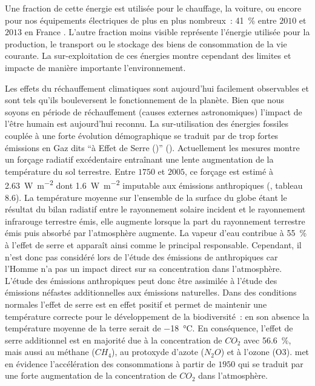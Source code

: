 Une fraction de cette énergie est utilisée pour le chauffage, la voiture, ou encore pour
nos équipements électriques de plus en plus nombreux~: \SI{+41}{\percent} entre $2010$ et
$2013$ en France \textcite{ADEME2015}. L’autre fraction moins visible représente
l’énergie utilisée pour la production, le transport ou le stockage des
biens de consommation de la vie courante. La sur-exploitation de ces énergies montre
cependant des limites et impacte de manière importante l’environnement.

Les effets du réchauffement climatiques sont aujourd’hui facilement observables et sont
tels qu’ils bouleversent le fonctionnement de la planète. Bien que nous soyons en période
de réchauffement (causes externes astronomiques) l’impact de l’être humain est aujourd’hui
reconnu. La sur-utilisation des énergies fossiles couplée à une forte évolution
démographique se traduit par de trop fortes émissions en Gaz dits \enquote{à Effet de
Serre ()} (). Actuellement les mesures montre un forçage
radiatif excédentaire entraînant une lente augmentation de la température du sol
terrestre. Entre $1750$ et $2005$, ce forçage est estimé à
\SI{2.63}{\watt\per\metre\squared} dont \SI{1.6}{\watt\per\metre\squared} imputable aux
émissions anthropiques (\cite{Myhre2013}, tableau 8.6). La température moyenne sur
l’ensemble de la surface du globe étant le résultat du bilan radiatif entre le rayonnement
solaire incident et le rayonnement infrarouge terrestre émis, elle augmente lorsque la
part du rayonnement terrestre émis puis absorbé par l’atmosphère augmente. La vapeur
d’eau contribue à \SI{55}{\percent} à l’effet de serre et apparaît ainsi comme le
principal responsable. Cependant, il n’est donc pas considéré lors de
l’étude des émissions de
 anthropiques car l’Homme n’a pas un impact direct sur sa concentration dans l’atmosphère.
L’étude des émissions anthropiques peut donc être assimilée à l’étude des émissions
néfastes additionnelles aux émissions naturelles. Dans des conditions normales l’effet de
serre est en effet positif et permet de maintenir une température correcte pour le
développement de la biodiversité~: en son absence la température moyenne de la terre
serait de \SI{-18}{\celsius}. En conséquence, l’effet de serre additionnel est en majorité
due à la concentration de $CO_{2}$ avec \SI{56.6}{\percent}, mais aussi au méthane
($CH_{4}$), au protoxyde d’azote ($N_{2}O$) et à l’ozone (O3).
 met en évidence l’accélération
des consommations à partir de $1950$ qui se traduit par une forte
augmentation de la concentration de $CO_{2}$ dans l’atmosphère.

